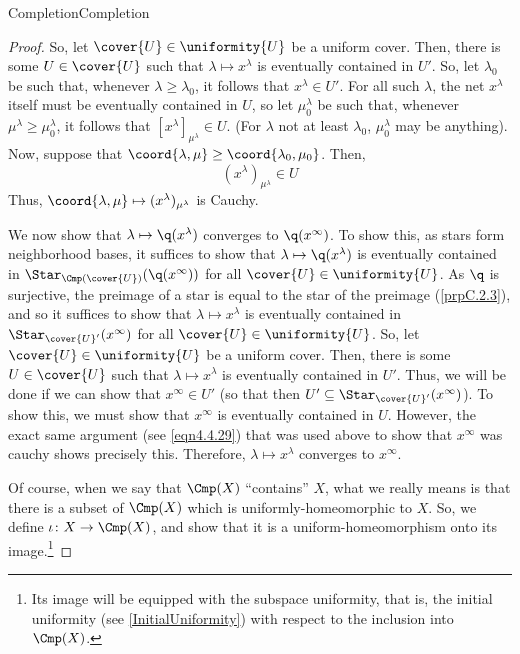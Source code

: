 \begin{thm}{Completion}{Completion}
\begin{proof}
So, let $\cover{U}\in \uniformity{U}$ be a uniform cover.  Then, there is some $U\in \cover{U}$ such that $\lambda \mapsto x^\lambda$ is eventually contained in $U'$.  So, let $\lambda _0$ be such that, whenever $\lambda \geq \lambda _0$, it follows that $x^\lambda \in U'$.  For all such $\lambda$, the net $x^\lambda$ itself must be eventually contained in $U$, so let $\mu _0^\lambda$ be such that, whenever $\mu ^\lambda \geq \mu _0^\lambda$, it follows that $[x^\lambda ]_{\mu ^\lambda}\in U$.  (For $\lambda$ not at least $\lambda _0$, $\mu _0^\lambda$ may be anything).  Now, suppose that $\coord{\lambda ,\mu}\geq \coord{\lambda _0,\mu _0}$.  Then,
\begin{equation}\label{eqn4.4.29}
(x^\lambda )_{\mu ^\lambda}\in U
\end{equation}
Thus, $\coord{\lambda ,\mu }\mapsto (x^\lambda )_{\mu ^\lambda}$ is Cauchy.

We now show that $\lambda \mapsto \q (x^\lambda )$ converges to $\q (x^\infty )$.  To show this, as stars form neighborhood bases, it suffices to show that $\lambda \mapsto \q (x^\lambda )$ is eventually contained in $\Star _{\Cmp (\cover{U})}(\q (x^\infty ))$ for all $\cover{U}\in \uniformity{U}$.  As $\q$ is surjective, the preimage of a star is equal to the star of the preimage (\cref{prpC.2.3}), and so it suffices to show that $\lambda \mapsto x^\lambda$ is eventually contained in $\Star _{\cover{U}'}(x^\infty )$ for all $\cover{U}\in \uniformity{U}$.  So, let $\cover{U}\in \uniformity{U}$ be a uniform cover.  Then, there is some $U\in \cover{U}$ such that $\lambda \mapsto x^\lambda$ is eventually contained in $U'$.  Thus, we will be done if we can show that $x^\infty \in U'$ (so that then $U'\subseteq \Star _{\cover{U}'}(x^\infty )$).  To show this, we must show that $x^\infty$ is eventually contained in $U$.  However, the exact same argument (see \eqref{eqn4.4.29}) that was used above to show that $x^\infty$ was cauchy shows precisely this.  Therefore, $\lambda \mapsto x^\lambda$ converges to $x^\infty$.

Of course, when we say that $\Cmp (X)$ ``contains'' $X$, what we really means is that there is a subset of $\Cmp (X)$ which is uniformly-homeomorphic to $X$.  So, we define $\iota \colon X\rightarrow \Cmp (X)$, and show that it is a uniform-homeomorphism onto its image.\footnote{Its image will be equipped with the subspace uniformity, that is, the initial uniformity (see \cref{InitialUniformity}) with respect to the inclusion into $\Cmp (X)$.}


\end{proof}
\end{thm}
